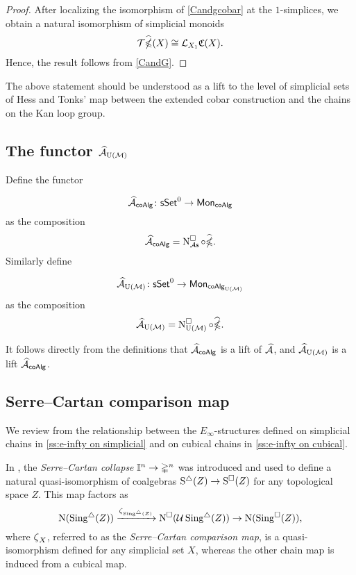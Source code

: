 \begin{proof}
	After localizing the isomorphism of \cref{Candgcobar} at the $1$-simplices, we obtain a natural isomorphism of simplicial monoids
	$$\mathcal{T} \widehat{\ccobar}(X) \cong \mathcal{L}_{X_1}\mathfrak{C}(X).$$
	Hence, the result follows from \cref{CandG}.
\end{proof}

The above statement should be understood as a lift to the level of simplicial sets of Hess and Tonks' map between the extended cobar construction and the chains on the Kan loop group.

\subsection{The functor $\Ahat_{\UM}$} \label{s:ahatum}

Define the functor

	$$\Ahat_{\coAlg} \colon \sSet^0 \to \Mon_{\coAlg}$$
	as the composition
	$$\Ahat_{\coAlg} = \cchainsAS \circ \widehat{\ccobar}.$$
Similarly define
	
	$$\Ahat_{\UM} \colon \sSet^0 \to \Mon_{\coAlg_{\UM}}$$
	as the composition
	$$\Ahat_{\UM} = \cchainsUM \circ \widehat{\ccobar}.$$

It follows directly from the definitions that $\Ahat_{\coAlg}$ is a lift of $\Ahat$, and $\Ahat_{\UM}$ is a lift $\Ahat_{\coAlg}$.

\subsection{Serre--Cartan comparison map}

We review from \cite{medina2021cubical} the relationship between the $E_\infty$-structures defined on simplicial chains in \cref{ss:e-infty on simplicial} and on cubical chains in \cref{ss:e-infty on cubical}.

In \cite[sect]{serre1951homologie}, the \textit{Serre--Cartan collapse} $\gcube^n \to \gsimplex^n$ was introduced and used to define a natural quasi-isomorphism of coalgebras $\sS(Z) \to \cS(Z)$ for any topological space $Z$.
This map factors as
\begin{equation*}
\chains(\sSing(Z)) \xra{\CS_{\sSing(Z)}}
\cchains(\mathcal{U} \sSing(Z)) \to
\chains(\cSing(Z)),
\end{equation*}
where $\CS_X$, referred to as the \textit{Serre--Cartan comparison map}, is a quasi-isomorphism defined for any simplicial set $X$, whereas the other chain map is induced from a cubical map.

